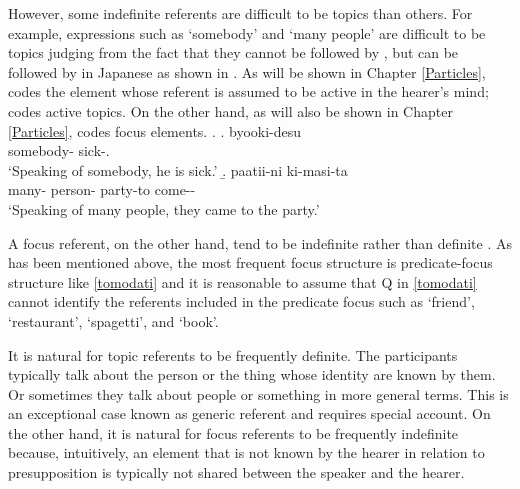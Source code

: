However,
some indefinite referents are difficult to be topics than others.
For example, expressions such as  `somebody' and  `many people' are difficult to be topics
judging from the fact that they cannot be followed by , but can be followed by  in Japanese as shown in \Next \cite[][p.\ 37 ff.]{kuno73}.
As will be shown in Chapter \ref{Particles},
 codes the element whose referent is assumed to be active in the hearer's mind;
 codes active topics.
On the other hand, as will also be shown in Chapter \ref{Particles},
 codes focus elements.
\ex. \a.  byooki-desu \\
		somebody- sick-. \\
		`Speaking of somebody, he is sick.'
	\b.   paatii-ni ki-masi-ta \\
		many- person- party-to come-- \\
		`Speaking of many people, they came to the party.'



A focus referent, on the other hand,
tend to be indefinite rather than definite \cite{givon76,keenan76,comrie79,comrie83,dubois87}.
As has been mentioned above,
the most frequent focus structure is predicate-focus structure like \ref{tomodati} and
it is reasonable to assume that Q in \ref{tomodati} cannot identify the referents included in the predicate focus such as `friend', `restaurant', `spagetti', and `book'.

%

It is natural for topic referents to be frequently definite.
The participants typically talk about the person or the thing whose identity are known by them.
Or sometimes they talk about people or something in more general terms.
This is an exceptional case known as generic referent and requires special account.
On the other hand, it is natural for focus referents to be frequently indefinite
because, intuitively, an element that is not known by the hearer in relation to presupposition is typically not shared between the speaker and the hearer.


